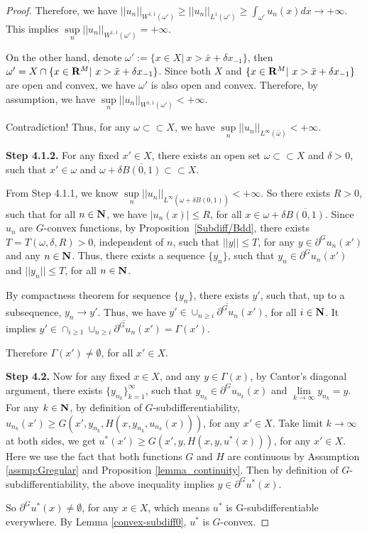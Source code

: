 \begin{proof}
	Therefore, we have $||u_n||_{W^{1,1}(\omega')} \ge ||u_n||_{L^{1}(\omega')} \ge \int_{\omega'} u_n(x) dx \rightarrow +\infty$. This implies $\sup\limits_{n} ||u_n||_{W^{1,1}(\omega')} = +\infty$.
	
	On the other hand, denote $\omega' := \{x\in X|~ x>\bar{x}+\delta x_{-1}\}$, then $\omega' = X \cap \{x\in {\mathbf R}^M|~ x> \bar{x}+\delta x_{-1} \}$. Since both $X$ and $\{x\in {\mathbf R}^M|~ x> \bar{x}+\delta x_{-1} \}$ are open and convex, we have $\omega'$ is also open and convex. Therefore, by assumption, we have $\sup\limits_{n} ||u_n||_{W^{1,1}(\omega')} < +\infty.$ 
	
	Contradiction! Thus, for any $\omega \subset \subset X$, we have $\sup\limits_{n}||u_n||_{L^{\infty}(\bar{\omega})}<+\infty$.
	
	{\bf Step 4.1.2.} For any fixed $x'\in X$, there exists an open set $\omega \subset \subset X$ and $\delta>0$, such that $x'\in \omega$ and $\omega + \delta \overline{B(0,1)} \subset \subset X$.
	
	From Step 4.1.1, we know  $\sup\limits_{n}||u_n||_{L^{\infty}(\omega + \delta \overline{B(0,1)})} < +\infty$. 
	So there exists $R>0$, such that for all $n\in \mathbf{N}$, we have $|u_n(x)|\le R$, for all $x \in \omega + \delta \overline{B(0,1)}$. Since $u_n$ are $G$-convex functions, by Proposition~\ref{Subdiff/Bdd}, there exists $T = T(\omega, \delta, R) >0$, independent of $n$, such that $||y||\le T$, for any $y \in \partial^G u_n(x')$ and any $n\in \mathbf{N}$. Thus, there exists a sequence $\{ y_n \}$, such that $y_n \in \partial^G u_n(x')$ and $||y_n||\le T$, for all $n\in \mathbf{N}$.
	
	By compactness theorem for sequence $\{ y_n \}$,  there exists $y'$, such that, up to a subsequence, $y_n \rightarrow y'$. Thus, we have $y' \in \overline{\cup_{n\ge i}\partial^G u_n(x')}$, for all $i\in \mathbf{N}$. It implies $y' \in \cap_{i\ge 1} \overline{\cup_{n\ge i}\partial^G u_n(x')} = \Gamma (x')$. 
	
	Therefore $\Gamma(x') \neq \emptyset$, for all $x' \in X$.\medskip
	

	
	{\bf Step 4.2.} Now for any fixed $x\in X$, and any $y\in \Gamma(x)$, by Cantor's diagonal argument, there exists $\{y_{n_k}\}_{k=1}^{\infty}$, such that $y_{n_k} \in \partial^G u_{n_k}(x)$ and $\lim\limits_{k\rightarrow \infty} y_{n_k} = y$.
	For any $k\in \mathbf{N}$, by definition of $G$-subdifferentiability,
	$u_{n_k}(x')\ge G(x', y_{n_k}, H(x, y_{n_k}, u_{n_k}(x)))$, for any $x' \in X$. Take limit $k \rightarrow \infty$ at both sides, we get $u^*(x') \ge G(x', y, H(x, y, u^*(x)))$, for any $x'\in X$. Here we use the fact that both functions $G$ and
	$H$ are continuous by Assumption \ref{assmp:Gregular} and Proposition \ref{lemma_continuity}.
	Then by definition of $G$-subdifferentiability, the above inequality implies $y\in \partial ^G u^*(x)$. 
	
	So $\partial^G u^*(x)\neq \emptyset$, for any $x\in X$, which means $u^*$ is G-subdifferentiable everywhere. By Lemma \ref{convex-subdiff0}, $u^*$ is $G$-convex.
\end{proof}

